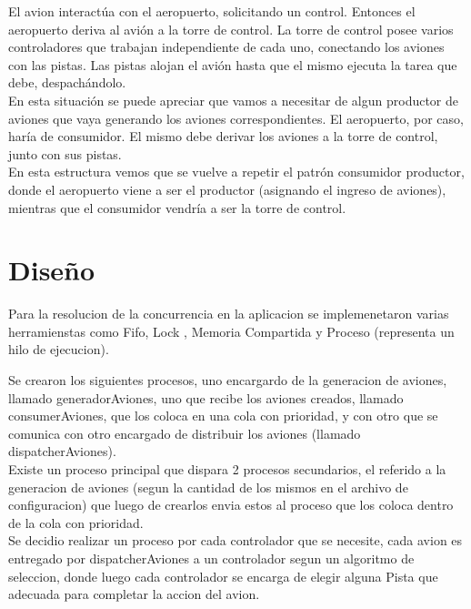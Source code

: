\documentclass[a4paper,12pt,titlepage]{article}
\begin{document}
El avion interactúa con el
aeropuerto, solicitando un control. Entonces el aeropuerto deriva al avión a la torre de control.
La torre de control posee varios controladores que trabajan independiente de cada uno, conectando los aviones
con las pistas. Las pistas alojan el avión hasta que el mismo ejecuta la tarea que debe, despachándolo.\\

En esta situación se puede apreciar que vamos a necesitar de algun productor de aviones
que vaya generando los aviones correspondientes. El aeropuerto, por caso, haría de consumidor.
El mismo debe derivar los aviones a la torre de control, junto con sus pistas.\\
En esta estructura vemos que se vuelve a repetir el patrón consumidor productor, donde el aeropuerto
viene a ser el productor (asignando el ingreso de aviones), mientras que el consumidor vendría a ser la torre de control.\\


\newpage
\section{Diseño}

Para la resolucion de la concurrencia en la aplicacion se implemenetaron varias herramienstas como Fifo, Lock , Memoria Compartida y Proceso (representa un hilo de ejecucion).

Se crearon los siguientes procesos, uno encargardo de la generacion de aviones, llamado generadorAviones, uno que recibe los aviones creados, llamado consumerAviones, que los coloca en una cola con prioridad, y con otro que se comunica con otro encargado de distribuir los aviones (llamado 
dispatcherAviones).\\

Existe un proceso principal que dispara 2 procesos secundarios, el referido a la generacion de aviones (segun la
cantidad de los mismos en el archivo de configuracion) que luego de crearlos envia estos al proceso que los
coloca dentro de la cola con prioridad.\\

Se decidio realizar un proceso por cada controlador que se necesite, cada avion es entregado por dispatcherAviones a un controlador segun un algoritmo de seleccion, donde luego cada controlador se encarga de elegir alguna Pista que adecuada para completar la accion del avion.\\
\end{document}
